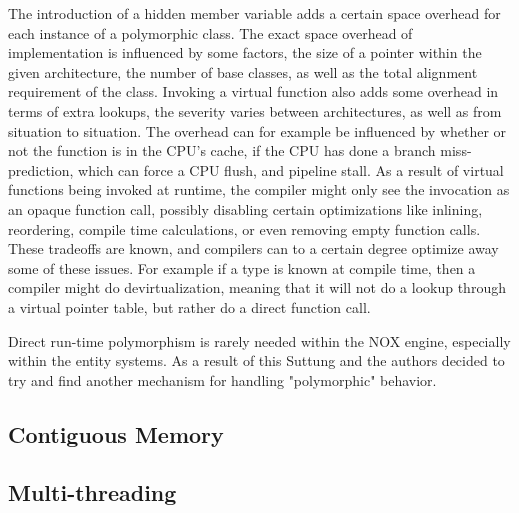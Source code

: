 The introduction of a hidden member variable adds a certain space overhead for each instance of a polymorphic class.
The exact space overhead of implementation is influenced by some factors, the size of a pointer within the given architecture, the number of base classes, as well as the total alignment requirement of the class.
Invoking a virtual function also adds some overhead in terms of extra lookups, the severity varies between architectures, as well as from situation to situation.
The overhead can for example be influenced by whether or not the function is in the CPU's cache,
if the CPU has done a branch miss-prediction, which can force a CPU flush, and pipeline stall.
As a result of virtual functions being invoked at runtime, the compiler might only see the invocation as an opaque function call, possibly disabling certain optimizations like inlining, reordering, compile time calculations, or even removing empty function calls. 
These tradeoffs are known, and compilers can to a certain degree optimize away some of these issues.
For example if a type is known at compile time, then a compiler might do devirtualization, meaning that it will not do a lookup through a virtual pointer table, but rather do a direct function call.

Direct run-time polymorphism is rarely needed within the NOX engine, especially within the entity systems.
As a result of this Suttung and the authors decided to try and find another mechanism for handling "polymorphic" behavior.

\subsection{Contiguous Memory}

\subsection{Multi-threading}

